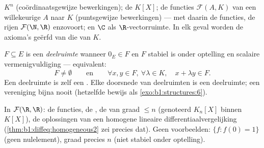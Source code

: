 \begin{example}\label{ex:b1:vspaces:examples}
$K^n$ (coördinaatsgewijze bewerkingen); de  $K[X]$; de
functies $\mathcal{F}(A, K)$ van een willekeurige  $A$
naar $K$ (puntsgewijze bewerkingen) --- met daarin de 
functies, de rijen $\mathcal{F}(\N, \R)$ enzovoort; en $\C$ als
$\R$-vectorruimte. In elk geval worden de axioma's geërfd van die
van $K$.
\end{example}

\begin{definition}[Deelruimte]\label{def:b1:vspaces:subspace}
$F \subseteq E$ is een \emph{deelruimte} wanneer
$0_E \in F$ en $F$ stabiel is onder optelling en scalaire
vermenigvuldiging --- equivalent:
\[
F \neq \emptyset
\qquad\text{en}\qquad
\forall x, y \in F,\ \forall \lambda \in K,\quad
x + \lambda y \in F .
\]
Een deelruimte is zelf een . Elke doorsnede van
deelruimten is een deelruimte; een vereniging bijna nooit (hetzelfde
bewijs als \cref{exo:b1:structures:6}).
\end{definition}

\begin{example}\label{ex:b1:vspaces:subspaces}
In $\mathcal{F}(\R, \R)$: de  functies, de , de
 van graad $\leq n$ (genoteerd $K_n[X]$ binnen $K[X]$), de
oplossingen van een homogene lineaire differentiaalvergelijking
(\cref{thm:b1:diffeq:homogeneous2} zei precies dat). Geen
voorbeelden: $\{f : f(0) = 1\}$ (geen nulelement), graad precies $n$
(niet stabiel onder optelling).
\end{example}


